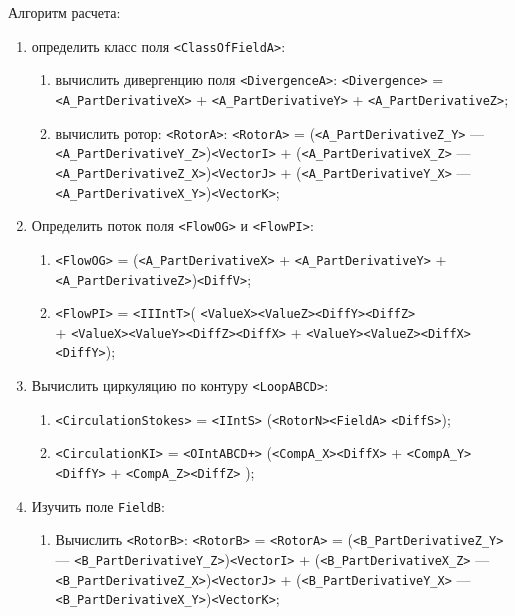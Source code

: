 \documentclass[14pt,a4paper,final]{extreport}
\begin{document}
Алгоритм расчета:
\begin{enumerate}[label=\arabic*.,ref=\arabic*]
	\item определить класс поля \texttt{<ClassOfFieldA>}:
	\begin{enumerate}[label=\arabic*),ref=\arabic*]
		\item вычислить дивергенцию поля \texttt{<DivergenceA>}: \texttt{<Divergence>} =  \texttt{<A\_PartDerivativeX>} +  \texttt{<A\_PartDerivativeY>} +  		\texttt{<A\_PartDerivativeZ>};
		\item вычислить ротор: \texttt{<RotorA>}:  \texttt{<RotorA>} = (\texttt{<A\_PartDerivativeZ\_Y>} --- \texttt{<A\_PartDerivativeY\_Z>})\texttt{<VectorI>} + 
(\texttt{<A\_PartDerivativeX\_Z>} --- \texttt{<A\_PartDerivativeZ\_X>})\texttt{<VectorJ>} + (\texttt{<A\_PartDerivativeY\_X>} ---  \texttt{<A\_PartDerivativeX\_Y>})\texttt{<VectorK>};
	\end{enumerate}

	\item Определить поток поля \texttt{<FlowOG>} и \texttt{<FlowPI>}:
	\begin{enumerate}[label=\arabic*),ref=\arabic*]
		\item \texttt{<FlowOG>} =  (\texttt{<A\_PartDerivativeX>} +  \texttt{<A\_PartDerivativeY>} +  \texttt{<A\_PartDerivativeZ>})\texttt{<DiffV>};

		\item \texttt{<FlowPI>} = \texttt{<IIIntT>}( \texttt{<ValueX>}\texttt{<ValueZ>}\texttt{<DiffY>}\texttt{<DiffZ>}\\ + 
\texttt{<ValueX>}\texttt{<ValueY>}\texttt{<DiffZ>}\texttt{<DiffX>} +
\texttt{<ValueY>}\texttt{<ValueZ>}\texttt{<DiffX>}\texttt{<DiffY>}); 
	\end{enumerate}


	\item Вычислить циркуляцию по контуру \texttt{<LoopABCD>}: 
	\begin{enumerate}[label=\arabic*),ref=\arabic*]
		\item \texttt{<CirculationStokes>} = \texttt{<IIntS>} (\texttt{<RotorN>}\texttt{<FieldA>} \texttt{<DiffS>});

		\item \texttt{<CirculationKI>} =  \texttt{<OIntABCD+>}  (\texttt{<CompA\_X>}\texttt{<DiffX>}  + \texttt{<CompA\_Y>}\texttt{<DiffY>} + \texttt{<CompA\_Z>}\texttt{<DiffZ>} );
	\end{enumerate}

	\item Изучить поле \texttt{FieldB}:
	\begin{enumerate}[label=\arabic*),ref=\arabic*]
		\item Вычислить \texttt{<RotorB>}: \texttt{<RotorB>} = \texttt{<RotorA>} = (\texttt{<B\_PartDerivativeZ\_Y>} --- \texttt{<B\_PartDerivativeY\_Z>})\texttt{<VectorI>} + 
(\texttt{<B\_PartDerivativeX\_Z>} --- \texttt{<B\_PartDerivativeZ\_X>})\texttt{<VectorJ>} + (\texttt{<B\_PartDerivativeY\_X>} ---  \texttt{<B\_PartDerivativeX\_Y>})\texttt{<VectorK>};


\end{enumerate}
\end{enumerate}
\end{document}
